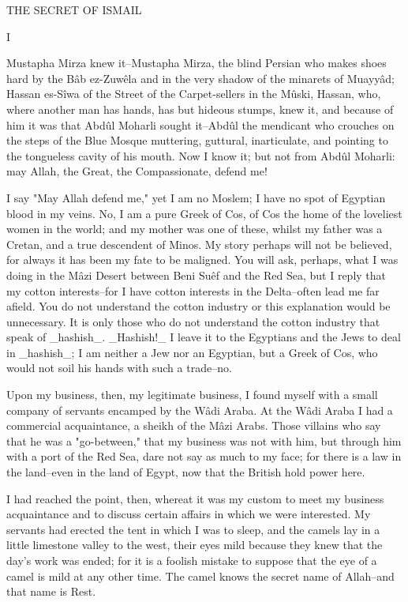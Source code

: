 THE SECRET OF ISMAIL


I

Mustapha Mirza knew it--Mustapha Mirza, the blind Persian who makes
shoes hard by the Bâb ez-Zuwêla and in the very shadow of the minarets
of Muayyâd; Hassan es-Sîwa of the Street of the Carpet-sellers in the
Mûski, Hassan, who, where another man has hands, has but hideous
stumps, knew it, and because of him it was that Abdûl Moharli sought
it--Abdûl the mendicant who crouches on the steps of the Blue Mosque
muttering, guttural, inarticulate, and pointing to the tongueless
cavity of his mouth. Now I know it; but not from Abdûl Moharli: may
Allah, the Great, the Compassionate, defend me!

I say "May Allah defend me," yet I am no Moslem; I have no spot of
Egyptian blood in my veins. No, I am a pure Greek of Cos, of Cos the
home of the loveliest women in the world; and my mother was one of
these, whilst my father was a Cretan, and a true descendent of Minos.
My story perhaps will not be believed, for always it has been my fate
to be maligned. You will ask, perhaps, what I was doing in the Mâzi
Desert between Beni Suêf and the Red Sea, but I reply that my cotton
interests--for I have cotton interests in the Delta--often lead me
far afield. You do not understand the cotton industry or this
explanation would be unnecessary. It is only those who do not
understand the cotton industry that speak of _hashish_. _Hashish!_
I leave it to the Egyptians and the Jews to deal in _hashish_; I am
neither a Jew nor an Egyptian, but a Greek of Cos, who would not soil
his hands with such a trade--no.

Upon my business, then, my legitimate business, I found myself with
a small company of servants encamped by the Wâdi Araba. At the Wâdi
Araba I had a commercial acquaintance, a sheikh of the Mâzi Arabs.
Those villains who say that he was a "go-between," that my business
was not with him, but through him with a port of the Red Sea, dare not
say as much to my face; for there is a law in the land--even in the
land of Egypt, now that the British hold power here.

I had reached the point, then, whereat it was my custom to meet my
business acquaintance and to discuss certain affairs in which we were
interested. My servants had erected the tent in which I was to sleep,
and the camels lay in a little limestone valley to the west, their
eyes mild because they knew that the day's work was ended; for it is
a foolish mistake to suppose that the eye of a camel is mild at any
other time. The camel knows the secret name of Allah--and that name is
Rest.

